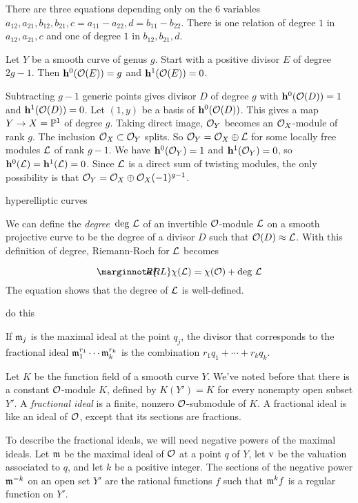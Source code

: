\documentclass[leqno]{book}
\newcommand\Marginnote[1]{\marginnote{\hspace{-12pt}\normalfont{#1}}}
\theoremstyle{definition}%
\numberwithin{equation}{section}
\theoremstyle{theorem} %
\begin{document}
\ms There are three equations depending only on the $6$ variables
$a_{12},a_{21},b_{12},b_{21},c = a_{11}-a_{22},d=b_{11}-b_{22}$.
There is one relation of degree $1$ in $a_{12},a_{21},c$ and one of
degree $1$ in $b_{12},b_{21},d$.

\bs Let $Y$ be a smooth curve of genus $g$.  Start with a positive
divisor $E$ of degree $2g-1$.  Then $\hh^0(\co(E)) = g$ and
$\hh^1(\co(E)) = 0$.

\ms Subtracting $g-1$ generic points gives divisor $D$ of degree $g$
with $\hh^0(\co(D)) = 1$ and $\hh^1(\co(D)) = 0$.  Let $(1,y)$ be a
basis of $\hh^0(\co(D))$.  This gives a map $Y \rightarrow X=\mathbb{P}^1$ of degree
$g$.  Taking direct image, $\co_Y$ becomes an $\co_X$-module of rank
$g$.  The inclusion $\co_X\subset \co_Y$ splits.  So $\co_Y =
\co_X\oplus \CL$ for some locally free modules $\CL$ of rank $g-1$.
We have $\hh^0(\co_Y) =1$ and $\hh^1(\co_Y)=0$, so $\hh^0(\CL) =
\hh^1(\CL) = 0$.  Since $\CL$ is a direct sum of twisting modules,
the only possibility is that $\co_Y = \co_X\oplus \co_X(-1)^{g-1}$.

\bs
hyperelliptic curves





\ms
We can define the {\it degree} $\,\deg \CL$ of an
 invertible $\co$-module $\CL$ on a smooth projective curve to be
 the degree of a divisor $D$ such that $\co(D) \approx \CL$.  With
 this definition of degree, Riemann-Roch for $\CL$ becomes

\begin{equation}
\Marginnote{RRL}\label{RRL}
\chi(\CL) =  \chi(\CO) + \deg \CL
\end{equation}
The equation shows that the degree of $\CL$  is well-defined.


do this

If $\mathfrak m_j$
is the maximal ideal at the point $q_j$, the divisor that corresponds to the
fractional ideal $\mathfrak m_1^{r_1}\cdots\mathfrak m_k^{r_k}$ is the combination
$r_1q_1+\cdots + r_kq_k$.

Let $K$ be the function field of a smooth curve $Y$.  We've noted
before that there is a  constant $\co$-module $K$, defined by $K(Y') =
K$ for every nonempty open subset $Y'$.  A {\it
  fractional ideal} is a finite, nonzero $\co$-submodule
of $K$.  A fractional ideal is like an ideal of $\co$, except that its
sections are fractions.

\ms To describe the fractional ideals, we will need
negative powers of the maximal ideals.  Let $\mathfrak m$ be the maximal ideal
of $\co$ at a point $q$ of $Y$, let $\operatorname{v}$ be the valuation associated
to $q$, and let $k$ be a positive integer.  The sections of the
negative power $\mathfrak m^{-k}$ on an open set $Y'$ are the rational
functions $f$ such that $\mathfrak m^k f$ is a regular function on $Y'$.  
\end{document}
